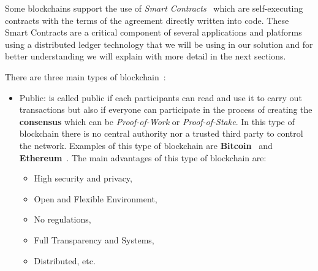 Some blockchains support the use of \textit{Smart Contracts}~\cite{kaur2023introduction} which are self-executing contracts with the terms of the agreement directly written into code.
These Smart Contracts are a critical component of several applications and platforms using a distributed ledger technology that we will be using in our solution and for better understanding we will explain with
more detail in the next sections.

There are three main types of blockchain~\cite{paul2021blockchain}:

\begin{itemize}
    \item {Public}: is called public if each participants can read and use it to carry out transactions but also
          if everyone can participate in the process of creating the \textbf{consensus} which can be \textit{Proof-of-Work} or \textit{Proof-of-Stake}.
          In this type of blockchain there is no central authority nor a trusted third party to control the network.
          Examples of this type of blockchain are \textbf{Bitcoin}~\cite{nakamoto2008bitcoin} and \textbf{Ethereum}~\cite{tual2015ethereum}. The main advantages of this type of blockchain are:
          \begin{itemize}
              \item High security and privacy,
              \item Open and Flexible Environment,
              \item No regulations,
              \item Full Transparency and Systems,
              \item Distributed, etc.
          \end{itemize}


\end{itemize}
